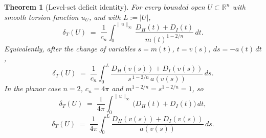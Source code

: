 \documentclass[11pt]{amsart}
\newtheorem{theorem}{Theorem}[section]
\newcommand{\R}{\mathbb R}
\newcommand{\dT}{\delta_T}
\begin{document}
\begin{theorem}[Level-set deficit identity]\label{thm:level-identity}
For every bounded open \(U\subset\R^n\) with smooth torsion function
\(u_U\), and with \(L:=|U|\),
\begin{equation}\label{eq:level-identity-t}
   \dT(U)
   \;=\;\frac{1}{c_n}\int_0^{\|u\|_\infty}
        \frac{D_H(t)+D_I(t)}{m(t)^{1-2/n}}\,dt.
\end{equation}
Equivalently, after the change of variables \(s=m(t)\), \(t=v(s)\),
\(ds=-a(t)\,dt\),
\begin{equation}\label{eq:level-identity-s}
   \dT(U)
   \;=\;\frac{1}{c_n}\int_0^{L}
        \frac{D_H(v(s))+D_I(v(s))}{s^{\,1-2/n}\,a(v(s))}\,ds.
\end{equation}
In the planar case \(n=2\), \(c_n=4\pi\) and \(m^{1-2/n}=s^{1-2/n}=1\),
so
\begin{equation}\label{eq:level-identity-2d-t}
   \dT(U)
   \;=\;\frac{1}{4\pi}\int_0^{\|u\|_\infty}\!\bigl(D_H(t)+D_I(t)\bigr)\,dt,
\end{equation}
\begin{equation}\label{eq:level-identity-2d-s}
   \dT(U)
   \;=\;\frac{1}{4\pi}\int_0^{L}\frac{D_H(v(s))+D_I(v(s))}{a(v(s))}\,ds.
\end{equation}
\end{theorem}
\end{document}
